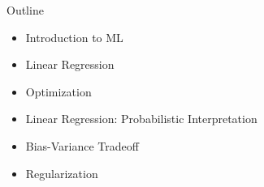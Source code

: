 \begin{frame}{Outline}
    \begin{itemize}
        \item Introduction to ML
        \item Linear Regression
        \item Optimization
        \item Linear Regression: Probabilistic Interpretation
        \item Bias-Variance Tradeoff
        \item Regularization
    \end{itemize}
\end{frame}
